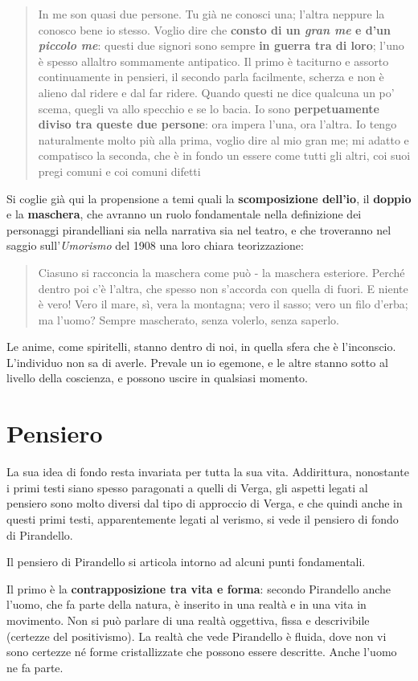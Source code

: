 \documentclass[a4paper, twoside, titlepage]{book}
\newcounter{mar}
\newcommand{\citazione}[1]{%
  \begin{quotation}
  \noindent #1
  \end{quotation}}
\begin{document}
\citazione{In me son quasi due persone. Tu già ne conosci una; l'altra neppure la conosco bene io stesso. Voglio dire che \textbf{consto di un \textit{gran me} e d'un \textit{piccolo me}}: questi due signori sono sempre \textbf{in guerra tra di loro}; l'uno è spesso allaltro sommamente antipatico. Il primo è taciturno e assorto continuamente in pensieri, il secondo parla facilmente, scherza e non è alieno dal ridere e dal far ridere. Quando questi ne dice qualcuna un po' scema, quegli va allo specchio e se lo bacia. Io sono \textbf{perpetuamente diviso tra queste due persone}: ora impera l'una, ora l'altra. Io tengo naturalmente molto più alla prima, voglio dire al mio gran me; mi adatto e compatisco la seconda, che è in fondo un essere come tutti gli altri, coi suoi pregi comuni e coi comuni difetti}

Si coglie già qui la propensione a temi quali la \textbf{scomposizione dell'io}, il \textbf{doppio} e la \textbf{maschera}, che avranno un ruolo fondamentale nella definizione dei personaggi pirandelliani sia nella narrativa sia nel teatro, e che troveranno nel saggio sull'\textit{Umorismo} del 1908 una loro chiara teorizzazione:

\citazione{Ciasuno si racconcia la maschera come può - la maschera esteriore. Perché dentro poi c'è l'altra, che spesso non s'accorda con quella di fuori. E niente è vero! Vero il mare, sì, vera la montagna; vero il sasso; vero un filo d'erba; ma l'uomo? Sempre mascherato, senza volerlo, senza saperlo.}

Le anime, come spiritelli, stanno dentro di noi, in quella sfera che è l'inconscio. L'individuo non sa di averle. Prevale un io egemone, e le altre stanno sotto al livello della coscienza, e possono uscire in qualsiasi momento.

\section{Pensiero}

La sua idea di fondo resta invariata per tutta la sua vita. Addirittura, nonostante i primi testi siano spesso paragonati a quelli di Verga, gli aspetti legati al pensiero sono molto diversi dal tipo di approccio di Verga, e che quindi anche in questi primi testi, apparentemente legati al verismo, si vede il pensiero di fondo di Pirandello.

Il pensiero di Pirandello si articola intorno ad alcuni punti fondamentali.

Il primo è la \textbf{contrapposizione tra vita e forma}: secondo Pirandello anche l'uomo, che fa parte della natura, è inserito in una realtà e in una vita in movimento. Non si può parlare di una realtà oggettiva, fissa e descrivibile (certezze del positivismo). La realtà che vede Pirandello è fluida, dove non vi sono certezze né forme cristallizzate che possono essere descritte. Anche l'uomo ne fa parte.
\end{document}
